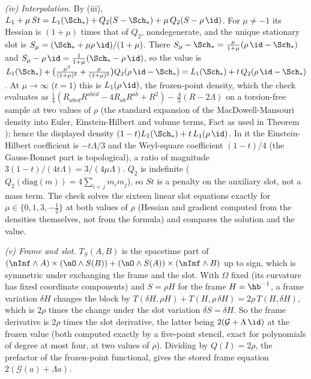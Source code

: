 \emph{(iv) Interpolation.} By (iii), $L_{1} + \mu\,St = L_{1}(\Sch_{*}) + Q_{2}(S - \Sch_{*}) + \mu\,Q_{2}(S - \rho\,\id)$. For $\mu \neq -1$ its Hessian is $(1 + \mu)$ times that of $Q_{2}$, nondegenerate, and the unique stationary slot is $S_{\mu} = (\Sch_{*} + \mu\rho\,\id)/(1 + \mu)$. There $S_{\mu} - \Sch_{*} = \tfrac{\mu}{1+\mu}(\rho\,\id - \Sch_{*})$ and $S_{\mu} - \rho\,\id = \tfrac{1}{1+\mu}(\Sch_{*} - \rho\,\id)$, so the value is $L_{1}(\Sch_{*}) + \bigl(\tfrac{\mu^{2}}{(1+\mu)^{2}} + \tfrac{\mu}{(1+\mu)^{2}}\bigr)Q_{2}(\rho\,\id - \Sch_{*}) = L_{1}(\Sch_{*}) + t\,Q_{2}(\rho\,\id - \Sch_{*})$. At $\mu \to \infty$ ($t = 1$) this is $L_{1}(\rho\,\id)$, the frozen-point density, which the check evaluates as $\tfrac14(R_{abcd}R^{abcd} - 4R_{ab}R^{ab} + R^{2}) - \tfrac{\Lambda}{3}(R - 2\Lambda)$ on a torsion-free sample at two values of $\rho$ (the standard expansion of the MacDowell-Mansouri density into Euler, Einstein-Hilbert and volume terms, Fact  as used in Theorem ); hence the displayed density $(1 - t)L_{1}(\Sch_{*}) + t\,L_{1}(\rho\,\id)$. In it the Einstein-Hilbert coefficient is $-t\Lambda/3$ and the Weyl-square coefficient $(1-t)/4$ (the Gauss-Bonnet part is topological), a ratio of magnitude $3(1-t)/(4t\Lambda) = 3/(4\mu\Lambda)$. $Q_{2}$ is indefinite ($Q_{2}(\mathrm{diag}(m)) = 4\sum_{i<j}m_{i}m_{j}$), so $St$ is a penalty on the auxiliary slot, not a mass term. The check solves the sixteen linear slot equations exactly for $\mu \in \{0, 1, 3, -\tfrac12\}$ at both values of $\rho$ (Hessian and gradient computed from the densities themselves, not from the formula) and compares the solution and the value.

\emph{(v) Frame and slot.} $T_{S}(A, B)$ is the spacetime part of $(\nInf \wedge A)\times(\nO \wedge S(B)) + (\nO \wedge S(A))\times(\nInf \wedge B)$ up to sign, which is symmetric under exchanging the frame and the slot. With $\Omega$ fixed (its curvature has fixed coordinate components) and $S = \rho H$ for the frame $H = \hb^{-1}$, a frame variation $\delta H$ changes the block by $T(\delta H, \rho H) + T(H, \rho\,\delta H) = 2\rho\,T(H, \delta H)$, which is $2\rho$ times the change under the slot variation $\delta S = \delta H$. So the frame derivative is $2\rho$ times the slot derivative, the latter being $2(\mathcal{G} + \Lambda\,\id)$ at the frozen value (both computed exactly by a five-point stencil, exact for polynomials of degree at most four, at two values of $\rho$). Dividing by $Q(I) = 2\rho$, the prefactor of the frozen-point functional, gives the stored frame equation $2(\mathcal{G}(a) + \Lambda a)$.


